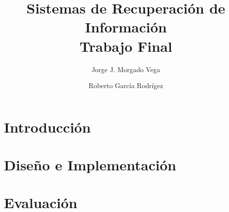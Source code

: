 \documentclass{llncs}
\begin{document}
\frontmatter
\pagestyle{headings}  %

\mainmatter              %
%
\title{Sistemas de Recuperación de Información\\ Trabajo Final}
%
%
\author{Jorge J. Morgado Vega \and Roberto García Rodrígez}
%
%
%

\maketitle              %

\renewcommand\abstractname{Resúmen.}
\renewcommand\keywordname{{\bf Palabras Claves:}}
\begin{abstract}
	
\keywords{}
\end{abstract}
\renewcommand\abstractname{Abstract.}
\renewcommand\keywordname{{\bf Keywords:}}
\begin{abstract}
	
\keywords{}
\end{abstract}
%

\tableofcontents
\clearpage

\section{Introducción}\label{sec:intro}


\section{Diseño e Implementación}\label{sec:design}


\section{Evaluación}\label{sec:eval}

\end{document}
